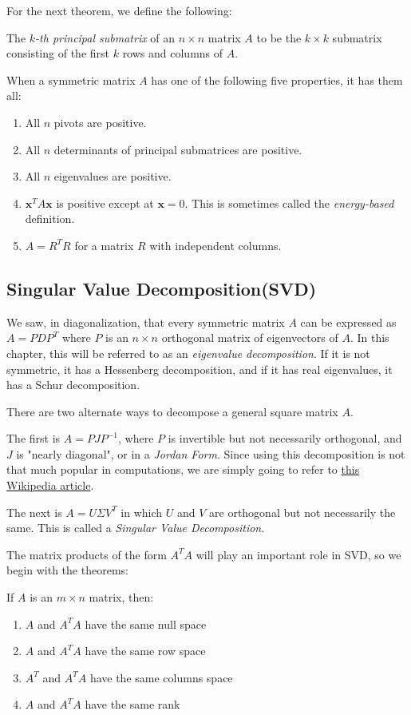 \documentclass{report}
\begin{document}
		For the next theorem, we define the following:
		\begin{defn}
			The \emph{$k$-th principal submatrix} of an $n \times n$ matrix $A$ to be the $k \times k$ submatrix consisting of the first $k$ rows and columns of $A$.
		\end{defn}
		
		\begin{thm}
			When a symmetric matrix $A$ has one of the following five properties, it has them all:
			\begin{enumerate}
				\item All $n$ pivots are positive.
				\item All $n$ determinants of principal submatrices are positive.
				\item All $n$ eigenvalues are positive.
				\item $\bm{x}^TA\bm{x}$ is positive except at $\bm{x}=0$. This is sometimes called the \emph{energy-based} definition.
				\item $A=R^TR$ for a matrix $R$ with independent columns.
			\end{enumerate}
		\end{thm}
		
		\subsection{Singular Value Decomposition(SVD)}
		We saw, in diagonalization, that every symmetric matrix $A$ can be expressed as $A=PDP^T$ where $P$ is an $n \times n$ orthogonal matrix of eigenvectors of $A$. In this chapter, this will be referred to as an \emph{eigenvalue decomposition}. If it is not symmetric, it has a Hessenberg decomposition, and if it has real eigenvalues, it has a Schur decomposition.
		
		There are two alternate ways to decompose a general square matrix $A$.
		
		The first is $A=PJP^{-1}$, where $P$ is invertible but not necessarily orthogonal, and $J$ is "nearly diagonal", or in a \emph{Jordan Form}. Since using this decomposition is not that much popular in computations, we are simply going to refer to \href{https://en.wikipedia.org/wiki/Jordan_normal_form}{this Wikipedia article}.
		
		The next is $A=U\Sigma V^T$ in which $U$ and $V$ are orthogonal but not necessarily the same. This is called a \emph{Singular Value Decomposition}.
		
		The matrix products of the form $A^TA$ will play an important role in SVD, so we begin with the theorems:
		\begin{thm}
			If $A$ is an $m \times n$ matrix, then:
			\begin{enumerate}
				\item $A$ and $A^TA$ have the same null space
				\item $A$ and $A^TA$ have the same row space
				\item $A^T$ and $A^TA$ have the same columns space
				\item $A$ and $A^TA$ have the same rank
			\end{enumerate}
		\end{thm}
		
\end{document}
